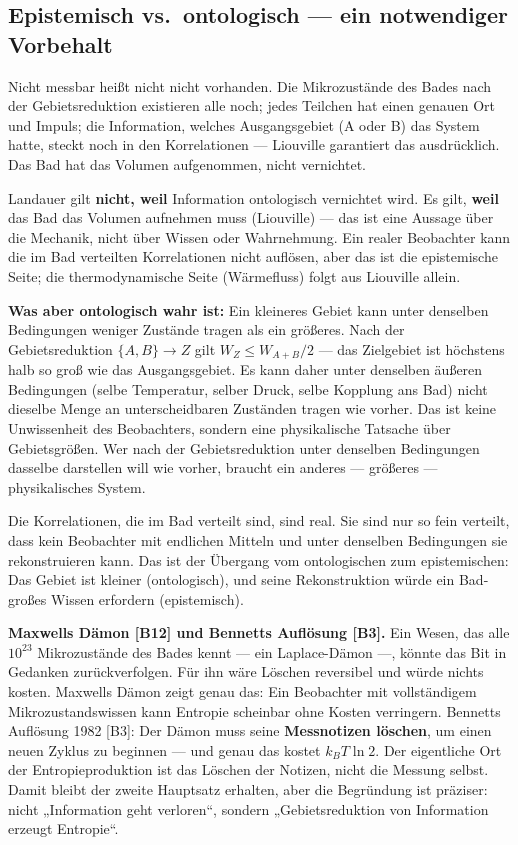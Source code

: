 \subsection{Epistemisch vs.\ ontologisch --- ein notwendiger Vorbehalt}

\LB Nicht messbar heißt nicht nicht vorhanden. Die Mikrozustände des Bades nach
der Gebietsreduktion existieren alle noch; jedes Teilchen hat einen genauen Ort
und Impuls; die Information, welches Ausgangsgebiet (A oder B) das System hatte,
steckt noch in den Korrelationen --- Liouville garantiert das ausdrücklich. Das
Bad hat das Volumen aufgenommen, nicht vernichtet.

Landauer gilt \textbf{nicht, weil} Information ontologisch vernichtet wird. Es
gilt, \textbf{weil} das Bad das Volumen aufnehmen muss (Liouville) --- das ist
eine Aussage über die Mechanik, nicht über Wissen oder Wahrnehmung. Ein realer
Beobachter kann die im Bad verteilten Korrelationen nicht auflösen, aber das ist
die epistemische Seite; die thermodynamische Seite (Wärmefluss) folgt aus
Liouville allein.

\LB \textbf{Was aber ontologisch wahr ist:} Ein kleineres Gebiet kann unter
denselben Bedingungen weniger Zustände tragen als ein größeres. Nach der
Gebietsreduktion $\{A,B\} \to Z$ gilt $W_Z \le W_{A+B}/2$ --- das Zielgebiet ist
höchstens halb so groß wie das Ausgangsgebiet. Es kann daher unter denselben
äußeren Bedingungen (selbe Temperatur, selber Druck, selbe Kopplung ans Bad) nicht
dieselbe Menge an unterscheidbaren Zuständen tragen wie vorher. Das ist keine
Unwissenheit des Beobachters, sondern eine physikalische Tatsache über
Gebietsgrößen. Wer nach der Gebietsreduktion unter denselben Bedingungen dasselbe
darstellen will wie vorher, braucht ein anderes --- größeres --- physikalisches
System.

Die Korrelationen, die im Bad verteilt sind, sind real. Sie sind nur so fein
verteilt, dass kein Beobachter mit endlichen Mitteln und unter denselben
Bedingungen sie rekonstruieren kann. Das ist der Übergang vom ontologischen zum
epistemischen: Das Gebiet ist kleiner (ontologisch), und seine Rekonstruktion
würde ein Bad-großes Wissen erfordern (epistemisch).

\LK \textbf{Maxwells Dämon [B12] und Bennetts Auflösung [B3].} Ein Wesen, das alle
$10^{23}$ Mikrozustände des Bades kennt --- ein Laplace-Dämon ---, könnte das Bit
in Gedanken zurückverfolgen. Für ihn wäre Löschen reversibel und würde nichts
kosten. Maxwells Dämon zeigt genau das: Ein Beobachter mit vollständigem
Mikrozustandswissen kann Entropie scheinbar ohne Kosten verringern. Bennetts
Auflösung 1982 [B3]: Der Dämon muss seine \textbf{Messnotizen löschen}, um einen
neuen Zyklus zu beginnen --- und genau das kostet $k_B T \ln 2$. Der eigentliche
Ort der Entropieproduktion ist das Löschen der Notizen, nicht die Messung selbst.
Damit bleibt der zweite Hauptsatz erhalten, aber die Begründung ist präziser:
nicht „Information geht verloren“, sondern „Gebietsreduktion von Information
erzeugt Entropie“.

